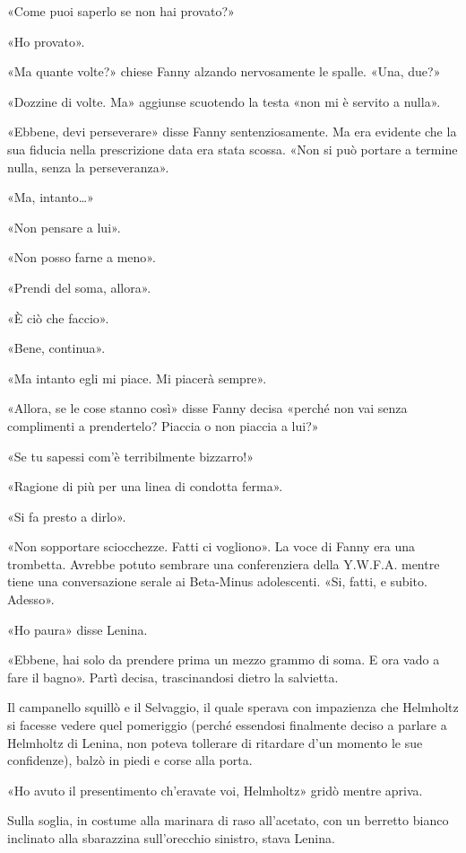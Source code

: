 \documentclass[
a5paper, %
10pt, %
twoside, 
onecolumn, %
openany, %
]{memoir}
\begin{document}
«Come puoi saperlo se non hai provato?»

«Ho provato».

«Ma quante volte?» chiese Fanny alzando nervosamente le spalle. «Una, due?»

«Dozzine di volte. Ma» aggiunse scuotendo la testa «non mi è servito a nulla».

«Ebbene, devi perseverare» disse Fanny sentenziosamente. Ma era evidente che la sua fiducia nella prescrizione data era stata scossa. «Non si può portare a termine nulla, senza la perseveranza».

«Ma, intanto…»

«Non pensare a lui».

«Non posso farne a meno».

«Prendi del soma, allora».

«È ciò che faccio».

«Bene, continua».

«Ma intanto egli mi piace. Mi piacerà sempre».

«Allora, se le cose stanno così» disse Fanny decisa «perché non vai senza complimenti a prendertelo? Piaccia o non piaccia a lui?»

«Se tu sapessi com’è terribilmente bizzarro!»

«Ragione di più per una linea di condotta ferma».

«Si fa presto a dirlo».

«Non sopportare sciocchezze. Fatti ci vogliono». La voce di Fanny era una trombetta. Avrebbe potuto sembrare una conferenziera della Y.W.F.A. mentre tiene una conversazione serale ai Beta-Minus adolescenti. «Si, fatti, e subito. Adesso».

«Ho paura» disse Lenina.

«Ebbene, hai solo da prendere prima un mezzo grammo di soma. E ora vado a fare il bagno». Partì decisa, trascinandosi dietro la salvietta.

Il campanello squillò e il Selvaggio, il quale sperava con impazienza che Helmholtz si facesse vedere quel pomeriggio (perché essendosi finalmente deciso a parlare a Helmholtz di Lenina, non poteva tollerare di ritardare d’un momento le sue confidenze), balzò in piedi e corse alla porta.

«Ho avuto il presentimento ch’eravate voi, Helmholtz» gridò mentre apriva.

Sulla soglia, in costume alla marinara di raso all’acetato, con un berretto bianco inclinato alla sbarazzina sull’orecchio sinistro, stava Lenina.
\end{document}
